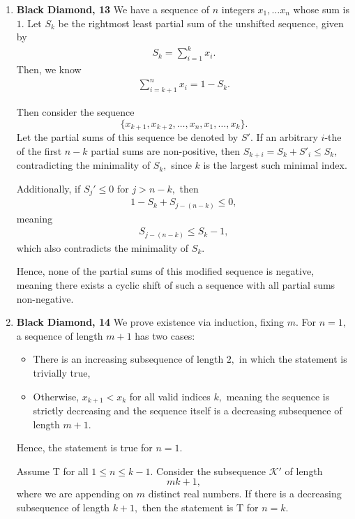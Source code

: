 \documentclass[12pt]{article}
\begin{document}
\begin{enumerate}
  \item \textbf{Black Diamond, 13} We have a sequence of $n$ integers
    $x_1, \ldots x_n$ whose sum is $1.$ Let $S_k$ be the rightmost
    least partial sum of the unshifted sequence, given by
    \begin{align*}
      S_k = \sum_{i =1}^{k} x_i.
    \end{align*}
    Then, we know
    \begin{align*}
      \sum_{i = k + 1}^{n} x_i = 1 - S_k.
    \end{align*}

    Then consider the sequence $$\{x_{k + 1}, x_{k + 2}, \ldots,
    x_{n}, x_1, \ldots, x_k\}.$$
    Let the partial sums of this sequence be denoted by $S'.$ If an
    arbitrary $i$-the of the first $n - k$ partial sums are
    non-positive, then $S_{k + i} = S_k + S'_i \leq S_k,$
    contradicting the minimality of $S_k,$ since $k$ is the largest
    such minimal index.

    Additionally, if $S_j' \leq  0$ for $j > n - k,$ then
    \begin{align*}
      1 - S_k + S_{j - (n - k)} \leq  0,
    \end{align*}
    meaning
    \begin{align*}
      S_{j - (n-k)} \leq S_k - 1,
    \end{align*}
    which also contradicts the minimality of $S_k.$

    Hence, none of the partial sums of this modified sequence is
    negative, meaning there exists a cyclic shift of such a sequence
    with all partial sums non-negative.

  \item \textbf{Black Diamond, 14} We prove existence via induction,
    fixing $m.$ For $n = 1,$ a sequence of length $m + 1$ has two cases:
    \begin{itemize}
      \item There is an increasing subsequence of length $2,$ in
        which the statement is trivially true,
      \item Otherwise, $x_{k + 1} < x_k$ for all valid indices $k,$
        meaning the sequence is strictly decreasing and the sequence
        itself is a decreasing subsequence of length $m + 1.$
    \end{itemize}
    Hence, the statement is true for $n = 1.$

    Assume T for all $1 \leq n \leq k - 1.$ Consider the subsequence
    $\mathcal K'$ of length
    $$
    mk + 1,
    $$
    where we are appending on $m$ distinct real numbers. If there is
    a decreasing subsequence of length $k + 1,$ then the statement is
    T for $n = k.$


\end{enumerate}
\end{document}
